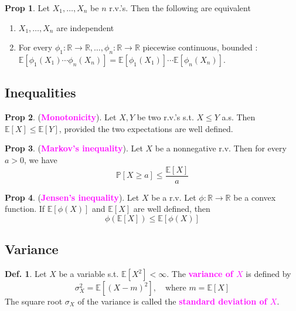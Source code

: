 \documentclass[8pt,a4paper,landscape]{article}
\theoremstyle{definition}
\newtheorem{definition}{Def.}[section]
\theoremstyle{example}
\theoremstyle{intuition}
\theoremstyle{definition}
\newtheorem{proposition}{Prop}[section]
\newcommand{\mydef}[1]{\textcolor{magenta}{\textbf{#1}}}
\newcommand{\prob}[1]{\mathbb{P}\left[ #1 \right]}
\newcommand{\expec}[1]{\mathbb{E}\left[ #1 \right]}
\begin{document}
\begin{multicols}{3}
			\begin{proposition}
				Let $X_1, \ldots, X_n$ be $n$ r.v.'s. Then the following are equivalent
				\begin{enumerate}[label=\roman*.]
					\item $X_1, \ldots, X_n$ are independent
					\item For every $\phi_1 : \mathbb{R} \to \mathbb{R}, \ldots, \phi_n : \mathbb{R} \to \mathbb{R}$ piecewise continuous, bounded : $\expec{\phi_1(X_1) \cdots \phi_n(X_n)} = \expec{\phi_1(X_1)} \cdots \expec{\phi_n(X_n)}$.
				\end{enumerate}
			\end{proposition}


		\subsection{Inequalities}
			\begin{proposition}
				(\mydef{Monotonicity}). Let $X,Y$ be two r.v.'s s.t. $X \leq Y$ a.s. Then
				$
					\expec{X} \leq \expec{Y}
				$,
				provided the two expectations are well defined.
			\end{proposition}

			\begin{proposition}
				(\mydef{Markov's inequality}). Let $X$ be a nonnegative r.v. Then for every $a > 0$, we have 
				$$
					\prob{X \geq a} \leq \frac{\expec{X}}{a}
				$$
			\end{proposition}

			\begin{proposition}
				(\mydef{Jensen's inequality}). Let $X$ be a r.v. Let $\phi : \mathbb{R} \to \mathbb{R}$ be a convex function. If $\expec{\phi(X)}$ and $\expec{X}$ are well defined, then
				$$
					\phi(\expec{X}) \leq \expec{\phi(X)}
				$$
			\end{proposition}


		\subsection{Variance}
			\begin{definition}
				Let $X$ be a variable s.t. $\expec{X^2} < \infty$. The \mydef{variance of $X$} is defined by 
				$$
					\sigma^2_X = \expec{(X - m)^2}, \quad \text{where } m = \expec{X}
				$$
				The square root $\sigma_X$ of the variance is called the \mydef{standard deviation of $X$}.
			\end{definition}


\end{multicols}
\end{document}
